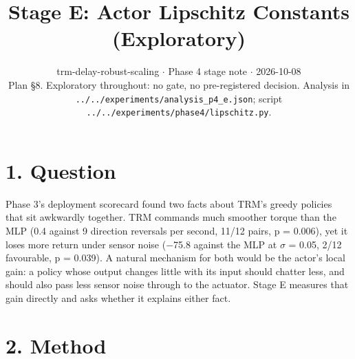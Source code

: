 \documentclass[11pt]{article}
\title{Stage E: Actor Lipschitz Constants (Exploratory)}
\author{}
\date{trm-delay-robust-scaling $\cdot$ Phase 4 stage note $\cdot$ 2026-10-08\\[2pt]Plan \S{}8. Exploratory throughout: no gate, no pre-registered decision. Analysis in \texttt{.\allowbreak{}.\allowbreak{}/\allowbreak{}.\allowbreak{}.\allowbreak{}/\allowbreak{}experiments/\allowbreak{}analysis\_\allowbreak{}p4\_\allowbreak{}e.\allowbreak{}json}; script \texttt{.\allowbreak{}.\allowbreak{}/\allowbreak{}.\allowbreak{}.\allowbreak{}/\allowbreak{}experiments/\allowbreak{}phase4/\allowbreak{}lipschitz.\allowbreak{}py}.}
\begin{document}
\maketitle
\section*{1. Question}



Phase 3's deployment scorecard found two facts about TRM's greedy policies that sit awkwardly together. TRM commands much smoother torque than the MLP (0.4 against 9 direction reversals per second, 11/12 pairs, p = 0.006), yet it loses more return under sensor noise ($-$75.8 against the MLP at $\sigma$ = 0.05, 2/12 favourable, p = 0.039). A natural mechanism for both would be the actor's local gain: a policy whose output changes little with its input should chatter less, and should also pass less sensor noise through to the actuator. Stage E measures that gain directly and asks whether it explains either fact.



\section*{2. Method}
\end{document}
